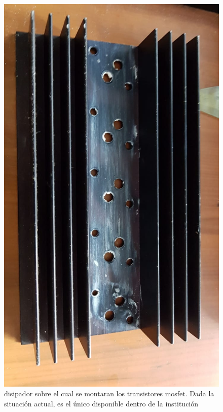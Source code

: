 \begin{figure}[ht!]
	\includegraphics[angle=90,width=\linewidth]{disipador_seleccionado}
	\caption{disipador sobre el cual se montaran los transistores mosfet. Dada la situación actual, es el único disponible dentro de la institución}
\end{figure}



